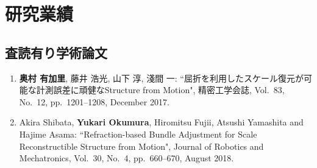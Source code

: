 \chapter*{研究業績}
\thispagestyle{empty}
\lhead[研究業績]{}
\label{achive}

\newpage
\section*{査読有り学術論文}
\mbox{}

\begin{enumerate}
\item
\textbf{奥村 有加里}, 藤井 浩光, 山下 淳, 淺間 一: ``屈折を利用したスケール復元が可能な計測誤差に頑健なStructure from Motion", 精密工学会誌, Vol.~83, No.~12, pp.~1201--1208, December 2017. 
\\

\item
Akira Shibata, \textbf{Yukari Okumura}, Hiromitsu Fujii, Atsushi Yamashita and Hajime Asama: ``Refraction-based Bundle Adjustment for Scale Reconstructible Structure from Motion", Journal of Robotics and Mechatronics, Vol.~30, No.~4, pp.~660--670, August 2018. 
\\

\end{enumerate}




